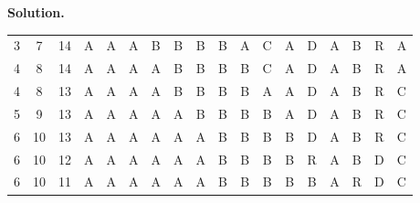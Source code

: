 \documentclass[12pt, a4paper]{article}
\newenvironment{sol}[1][Solution]
{\par\medskip\noindent \textbf{#1.} }
{\medskip}
\begin{document}
\begin{sol}
\begin{center}
\begin{tabular}{ccc|ccccccccccccccc}
				3 & 7 & 14 &
				{\color{gray}A} & {\color{gray}A} & {\color{gray}A} & {\color{black}B} & {\color{gray}B} & {\color{gray}B} & {\color{gray}B} & {\color{red}A} & {\color{gray}C} & {\color{gray}A} & {\color{gray}D} & {\color{gray}A} & {\color{gray}B} & {\color{gray}R} & {\color{black}A} \\
				
				4 & 8 & 14 &
				{\color{gray}A} & {\color{gray}A} & {\color{gray}A} & {\color{gray}A} & {\color{black}B} & {\color{gray}B} & {\color{gray}B} & {\color{gray}B} & {\color{red}C} & {\color{gray}A} & {\color{gray}D} & {\color{gray}A} & {\color{gray}B} & {\color{gray}R} & {\color{black}A} \\
				
				4 & 8 & 13 &
				{\color{gray}A} & {\color{gray}A} & {\color{gray}A} & {\color{gray}A} & {\color{black}B} & {\color{gray}B} & {\color{gray}B} & {\color{gray}B} & {\color{red}A} & {\color{gray}A} & {\color{gray}D} & {\color{gray}A} & {\color{gray}B} & {\color{black}R} & {\color{gray}C} \\
				
				5 & 9 & 13 &
				{\color{gray}A} & {\color{gray}A} & {\color{gray}A} & {\color{gray}A} & {\color{gray}A} & {\color{black}B} & {\color{gray}B} & {\color{gray}B} & {\color{gray}B} & {\color{red}A} & {\color{gray}D} & {\color{gray}A} & {\color{gray}B} & {\color{black}R} & {\color{gray}C} \\
				
				6 & 10 & 13 &
				{\color{gray}A} & {\color{gray}A} & {\color{gray}A} & {\color{gray}A} & {\color{gray}A} & {\color{gray}A} & {\color{black}B} & {\color{gray}B} & {\color{gray}B} & {\color{gray}B} & {\color{red}D} & {\color{gray}A} & {\color{gray}B} & {\color{black}R} & {\color{gray}C} \\
				
				6 & 10 & 12 &
				{\color{gray}A} & {\color{gray}A} & {\color{gray}A} & {\color{gray}A} & {\color{gray}A} & {\color{gray}A} & {\color{black}B} & {\color{gray}B} & {\color{gray}B} & {\color{gray}B} & {\color{red}R} & {\color{gray}A} & {\color{black}B} & {\color{gray}D} & {\color{gray}C} \\
				
				6 & 10 & 11 &
				{\color{gray}A} & {\color{gray}A} & {\color{gray}A} & {\color{gray}A} & {\color{gray}A} & {\color{gray}A} & {\color{black}B} & {\color{gray}B} & {\color{gray}B} & {\color{gray}B} & {\color{red}B} & {\color{black}A} & {\color{gray}R} & {\color{gray}D} & {\color{gray}C} \\
				

\end{tabular}
\end{center}
\end{sol}
\end{document}
